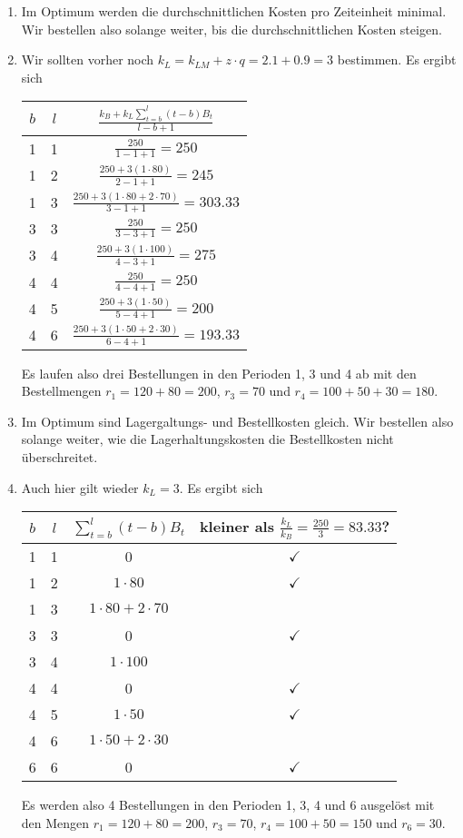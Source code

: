 \documentclass{article}
\begin{document}
	\begin{enumerate}[label=(\alph*)]
		\item Im Optimum werden die durchschnittlichen Kosten pro Zeiteinheit minimal. Wir bestellen also solange weiter, bis die durchschnittlichen Kosten steigen.
		\item Wir sollten vorher noch $k_L = k_{LM} + z\cdot q = 2.1 + 0.9 = 3$ bestimmen. Es ergibt sich
		\begin{center}
			\begin{tabular}{c|c|c}
				$b$ & $l$ & $\frac{k_B + k_L\sum_{t=b}^{l} (t-b)B_t}{l-b+1}$ \\
				\hline\hline
				1 & 1 & $\frac{250}{1-1+1} = 250$ \\
				1 & 2 & $\frac{250 + 3(1\cdot 80)}{2-1+1} = 245$ \\
				1 & 3 & $\frac{250 + 3(1\cdot 80 + 2\cdot 70)}{3-1+1} = 303.33$ \\
				\hline
				3 & 3 & $\frac{250}{3-3+1} = 250$ \\
				3 & 4 & $\frac{250 + 3(1\cdot 100)}{4-3+1} = 275$ \\
				\hline
				4 & 4 & $\frac{250}{4-4+1} = 250$ \\
				4 & 5 & $\frac{250 + 3(1\cdot 50)}{5-4+1} = 200$ \\
				4 & 6 & $\frac{250 + 3(1\cdot 50 + 2\cdot 30)}{6-4+1} = 193.33$
			\end{tabular}
		\end{center}
		Es laufen also drei Bestellungen in den Perioden 1, 3 und 4 ab mit den Bestellmengen $r_1=120+80=200$, $r_3=70$ und $r_4=100+50+30=180$.
		\item Im Optimum sind Lagergaltungs- und Bestellkosten gleich. Wir bestellen also solange weiter, wie die Lagerhaltungskosten die Bestellkosten nicht überschreitet.
		\item Auch hier gilt wieder $k_L=3$. Es ergibt sich
		\begin{center}
			\begin{tabular}{c|c|c|c}
				$b$ & $l$ & $\sum_{t=b}^l (t-b)B_t$ & kleiner als $\frac{k_L}{k_B}=\frac{250}{3}=83.33$? \\
				\hline\hline
				1 & 1 & 0 & $\checkmark$ \\
				1 & 2 & $1\cdot 80$ & $\checkmark$ \\
				1 & 3 & $1\cdot 80 + 2\cdot 70$ & \\
				\hline
				3 & 3 & 0 & $\checkmark$ \\
				3 & 4 & $1\cdot 100$ & \\
				\hline
				4 & 4 & 0 & $\checkmark$ \\
				4 & 5 & $1\cdot 50$ & $\checkmark$ \\
				4 & 6 & $1\cdot 50 + 2\cdot 30$ & \\
				\hline
				6 & 6 & 0 & $\checkmark$ 
			\end{tabular}
		\end{center}
		Es werden also 4 Bestellungen in den Perioden 1, 3, 4 und 6 ausgelöst mit den Mengen $r_1=120+80=200$, $r_3=70$, $r_4=100+50=150$ und $r_6=30$.
	\end{enumerate}
	
\end{document}
